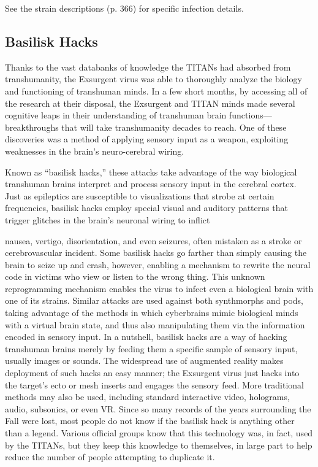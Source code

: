 See the strain descriptions (p. 366) for specific infection details. 

\subsection{Basilisk Hacks} 

Thanks to the vast databanks of knowledge the TITANs had absorbed from transhumanity, the Exsurgent virus was able to thoroughly analyze the biology and functioning of transhuman minds. In a few short months, by accessing all of the research at their disposal, the Exsurgent and TITAN minds made several cognitive leaps in their understanding of transhuman brain functions— breakthroughs that will take transhumanity decades to reach. One of these discoveries was a method of applying sensory input as a weapon, exploiting weaknesses in the brain's neuro-cerebral wiring. 

Known as ``basilisk hacks,'' these attacks take advantage of the way biological transhuman brains interpret and process sensory input in the cerebral cortex. Just as epileptics are susceptible to visualizations that strobe at certain frequencies, basilisk hacks employ special visual and auditory patterns that trigger glitches in the brain's neuronal wiring to inflict 

nausea, vertigo, disorientation, and even seizures, often mistaken as a stroke or cerebrovascular incident. Some basilisk hacks go farther than simply causing the brain to seize up and crash, however, enabling a mechanism to rewrite the neural code in victims who view or listen to the wrong thing. This unknown reprogramming mechanism enables the virus to infect even a biological brain with one of its strains. Similar attacks are used against both synthmorphs and pods, taking advantage of the methods in which cyberbrains mimic biological minds with a virtual brain state, and thus also manipulating them via the information encoded in sensory input. In a nutshell, basilisk hacks are a way of hacking transhuman brains merely by feeding them a specific sample of sensory input, usually images or sounds. The widespread use of augmented reality makes deployment of such hacks an easy manner; the Exsurgent virus just hacks into the target's ecto or mesh inserts and engages the sensory feed. More traditional methods may also be used, including standard interactive video, holograms, audio, subsonics, or even VR. Since so many records of the years surrounding the Fall were lost, most people do not know if the basilisk hack is anything other than a legend. Various official groups know that this technology was, in fact, used by the TITANs, but they keep this knowledge to themselves, in large part to help reduce the number of people attempting to duplicate it. 

